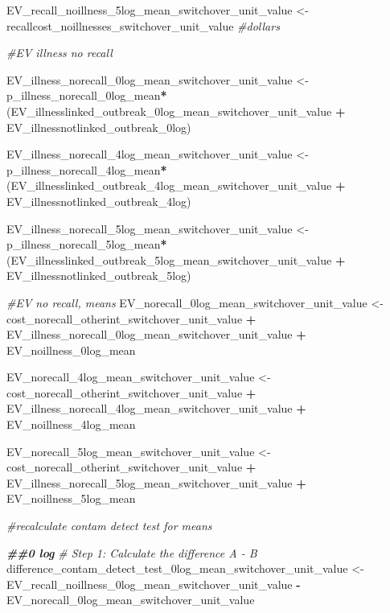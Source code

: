 \documentclass[
]{article}
\newenvironment{Shaded}{\begin{snugshade}}{\end{snugshade}}
\newcommand{\CommentTok}[1]{\textcolor[rgb]{0.56,0.35,0.01}{\textit{#1}}}
\newcommand{\DocumentationTok}[1]{\textcolor[rgb]{0.56,0.35,0.01}{\textbf{\textit{#1}}}}
\newcommand{\NormalTok}[1]{#1}
\newcommand{\OtherTok}[1]{\textcolor[rgb]{0.56,0.35,0.01}{#1}}
\newcommand{\SpecialCharTok}[1]{\textcolor[rgb]{0.81,0.36,0.00}{\textbf{#1}}}
\begin{document}
\begin{Shaded}
\begin{Highlighting}[]
\NormalTok{EV\_recall\_noillness\_5log\_mean\_switchover\_unit\_value }\OtherTok{\textless{}{-}}\NormalTok{ recallcost\_noillnesses\_switchover\_unit\_value }\CommentTok{\#dollars}


\CommentTok{\#EV illness no recall}

\NormalTok{EV\_illness\_norecall\_0log\_mean\_switchover\_unit\_value }\OtherTok{\textless{}{-}}\NormalTok{ p\_illness\_norecall\_0log\_mean}\SpecialCharTok{*}\NormalTok{(EV\_illnesslinked\_outbreak\_0log\_mean\_switchover\_unit\_value }\SpecialCharTok{+}\NormalTok{ EV\_illnessnotlinked\_outbreak\_0log)}

\NormalTok{EV\_illness\_norecall\_4log\_mean\_switchover\_unit\_value }\OtherTok{\textless{}{-}}\NormalTok{ p\_illness\_norecall\_4log\_mean}\SpecialCharTok{*}\NormalTok{(EV\_illnesslinked\_outbreak\_4log\_mean\_switchover\_unit\_value }\SpecialCharTok{+}\NormalTok{ EV\_illnessnotlinked\_outbreak\_4log)}

\NormalTok{EV\_illness\_norecall\_5log\_mean\_switchover\_unit\_value }\OtherTok{\textless{}{-}}\NormalTok{ p\_illness\_norecall\_5log\_mean}\SpecialCharTok{*}\NormalTok{(EV\_illnesslinked\_outbreak\_5log\_mean\_switchover\_unit\_value }\SpecialCharTok{+}\NormalTok{ EV\_illnessnotlinked\_outbreak\_5log)}


\CommentTok{\#EV no recall, means}
\NormalTok{EV\_norecall\_0log\_mean\_switchover\_unit\_value }\OtherTok{\textless{}{-}}\NormalTok{ cost\_norecall\_otherint\_switchover\_unit\_value }\SpecialCharTok{+}\NormalTok{ EV\_illness\_norecall\_0log\_mean\_switchover\_unit\_value }\SpecialCharTok{+}\NormalTok{ EV\_noillness\_0log\_mean}

\NormalTok{EV\_norecall\_4log\_mean\_switchover\_unit\_value }\OtherTok{\textless{}{-}}\NormalTok{ cost\_norecall\_otherint\_switchover\_unit\_value }\SpecialCharTok{+}\NormalTok{ EV\_illness\_norecall\_4log\_mean\_switchover\_unit\_value }\SpecialCharTok{+}\NormalTok{ EV\_noillness\_4log\_mean}

\NormalTok{EV\_norecall\_5log\_mean\_switchover\_unit\_value }\OtherTok{\textless{}{-}}\NormalTok{ cost\_norecall\_otherint\_switchover\_unit\_value }\SpecialCharTok{+}\NormalTok{ EV\_illness\_norecall\_5log\_mean\_switchover\_unit\_value }\SpecialCharTok{+}\NormalTok{ EV\_noillness\_5log\_mean}


\CommentTok{\#recalculate contam detect test for means}

\DocumentationTok{\#\#0 log}
\CommentTok{\# Step 1: Calculate the difference A {-} B}
\NormalTok{difference\_contam\_detect\_test\_0log\_mean\_switchover\_unit\_value }\OtherTok{\textless{}{-}}\NormalTok{ EV\_recall\_noillness\_0log\_mean\_switchover\_unit\_value }\SpecialCharTok{{-}}\NormalTok{ EV\_norecall\_0log\_mean\_switchover\_unit\_value}


\end{Highlighting}
\end{Shaded}
\end{document}
